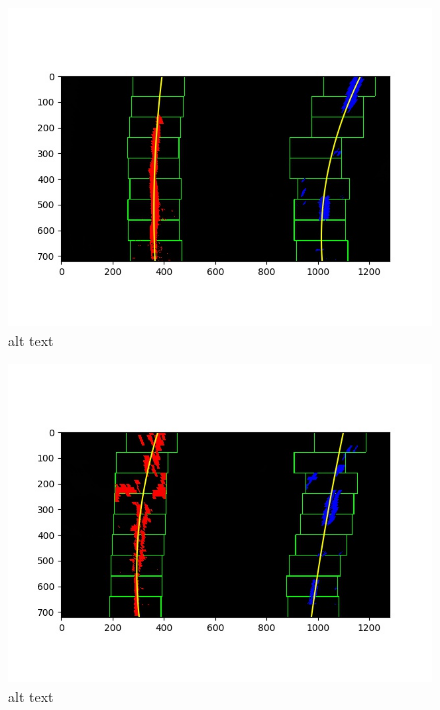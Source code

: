 \documentclass[11pt]{article}
\makeatletter
\def\maxwidth{\ifdim\Gin@nat@width>\linewidth\linewidth
    \else\Gin@nat@width\fi}
\let\Oldincludegraphics\includegraphics
\renewcommand{\includegraphics}[1]{\Oldincludegraphics[width=.8\maxwidth]{#1}}
\makeatother
\begin{document}
\begin{figure}
\centering
\includegraphics{./output_images/general_sliding_window/lines_Identified_test4.jpg}
\caption{alt text}
\end{figure}

\begin{figure}
\centering
\includegraphics{./output_images/general_sliding_window/lines_Identified_test5.jpg}
\caption{alt text}
\end{figure}
\end{document}
